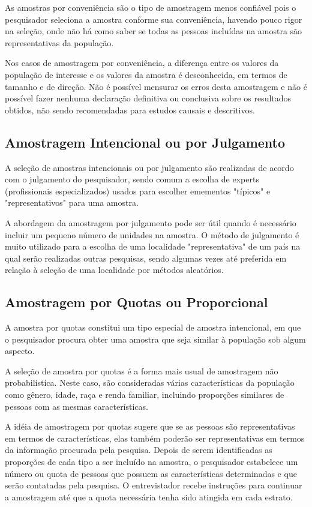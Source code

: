 As amostras por conveniência são o tipo de amostragem menos confiável pois o pesquisador seleciona a amostra conforme sua conveniência, havendo pouco rigor na seleção, onde não há como saber se todas as pessoas incluídas na amostra são representativas da população.\vskip0.3cm



Nos casos de amostragem por conveniência, a diferença entre os valores da população de interesse e os valores da amostra é desconhecida, em termos de tamanho e de direção. Não é possível mensurar os erros desta amostragem e não é possível fazer nenhuma declaração definitiva ou conclusiva sobre os resultados obtidos, não sendo recomendadas para estudos causais e descritivos.




\subsection{Amostragem Intencional ou por Julgamento}

A seleção de amostras intencionais ou por julgamento são realizadas de acordo com o julgamento do pesquisador, sendo comum a escolha de experts (profissionais especializados) usados para escolher emementos "típicos" e "representativos" para uma amostra.
\vskip0.3cm


A abordagem da amostragem por julgamento pode ser útil quando é necessário incluir um pequeno número de unidades na amostra. O método de julgamento é muito utilizado para a escolha de uma localidade "representativa" de um país na qual serão realizadas outras pesquisas, sendo algumas vezes até preferida em relação à seleção de uma localidade por métodos aleatórios.

\subsection{Amostragem por Quotas ou Proporcional}


A amostra por quotas constitui um tipo especial de amostra intencional, em que o pesquisador procura obter uma amostra que seja similar à população sob algum aspecto.\vskip0.3cm

A seleção de amostra por quotas é a forma mais usual de amostragem não probabilística. Neste caso, são consideradas várias características da população como gênero, idade, raça e renda familiar, incluindo proporções similares de pessoas com as mesmas características.\vskip0.3cm


A idéia de amostragem por quotas sugere que se as pessoas são representativas em termos de características, elas também poderão ser representativas em termos da informação procurada pela pesquisa. Depois de serem identificadas as proporções de cada tipo a ser incluído na amostra, o pesquisador estabelece um número ou quota de pessoas que possuem as características determinadas e que serão contatadas pela pesquisa. O entrevistador recebe instruções para continuar a amostragem até que a quota necessária tenha sido atingida em cada estrato.\vskip0.3cm



